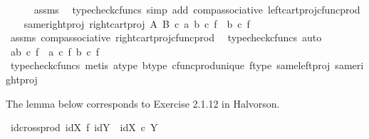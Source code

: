 \begin{isabellebody}
\ \ \ \ \isamarkupfalse%
\ assms\ \isamarkupfalse%
\ {\isacharparenleft}{\kern0pt}typecheck{\isacharunderscore}{\kern0pt}cfuncs{\isacharcomma}{\kern0pt}\ simp\ add{\isacharcolon}{\kern0pt}\ comp{\isacharunderscore}{\kern0pt}associative{}\ left{\isacharunderscore}{\kern0pt}cart{\isacharunderscore}{\kern0pt}proj{\isacharunderscore}{\kern0pt}cfunc{\isacharunderscore}{\kern0pt}prod{\isacharparenright}{\kern0pt}\isanewline
\ \ \isamarkupfalse%
\ same{\isacharunderscore}{\kern0pt}right{\isacharunderscore}{\kern0pt}proj{\isacharcolon}{\kern0pt}\ {\isachardoublequoteopen}right{\isacharunderscore}{\kern0pt}cart{\isacharunderscore}{\kern0pt}proj\ A\ B\ {\isasymcirc}\isactrlsub c\ {\isasymlangle}a{\isacharcomma}{\kern0pt}\ b{\isasymrangle}\ {\isasymcirc}\isactrlsub c\ f\ {\isacharequal}{\kern0pt}\ b\ {\isasymcirc}\isactrlsub c\ f{\isachardoublequoteclose}\isanewline
\ \ \ \ \isamarkupfalse%
\ assms\ comp{\isacharunderscore}{\kern0pt}associative{}\ right{\isacharunderscore}{\kern0pt}cart{\isacharunderscore}{\kern0pt}proj{\isacharunderscore}{\kern0pt}cfunc{\isacharunderscore}{\kern0pt}prod\ \isamarkupfalse%
\ {\isacharparenleft}{\kern0pt}typecheck{\isacharunderscore}{\kern0pt}cfuncs{\isacharcomma}{\kern0pt}\ auto{\isacharparenright}{\kern0pt}\isanewline
\ \ \isamarkupfalse%
\ {\isachardoublequoteopen}{\isasymlangle}a{\isacharcomma}{\kern0pt}b{\isasymrangle}\ {\isasymcirc}\isactrlsub c\ f\ {\isacharequal}{\kern0pt}\ {\isasymlangle}a\ {\isasymcirc}\isactrlsub c\ f{\isacharcomma}{\kern0pt}\ b\ {\isasymcirc}\isactrlsub c\ f{\isasymrangle}{\isachardoublequoteclose}\isanewline
\ \ \ \ \isamarkupfalse%
\ {\isacharparenleft}{\kern0pt}typecheck{\isacharunderscore}{\kern0pt}cfuncs{\isacharcomma}{\kern0pt}\ metis\ a{\isacharunderscore}{\kern0pt}type\ b{\isacharunderscore}{\kern0pt}type\ cfunc{\isacharunderscore}{\kern0pt}prod{\isacharunderscore}{\kern0pt}unique\ f{\isacharunderscore}{\kern0pt}type\ same{\isacharunderscore}{\kern0pt}left{\isacharunderscore}{\kern0pt}proj\ same{\isacharunderscore}{\kern0pt}right{\isacharunderscore}{\kern0pt}proj{\isacharparenright}{\kern0pt}\isanewline
{}\isamarkupfalse%
%
\endisatagproof
{\isafoldproof}%
%
\isadelimproof
%
\endisadelimproof
%
\begin{isamarkuptext}%
The lemma below corresponds to Exercise 2.1.12 in Halvorson.%
\end{isamarkuptext}\isamarkuptrue%
\isamarkupfalse%
\ id{\isacharunderscore}{\kern0pt}cross{\isacharunderscore}{\kern0pt}prod{\isacharcolon}{\kern0pt}\ {\isachardoublequoteopen}id{\isacharparenleft}{\kern0pt}X{\isacharparenright}{\kern0pt}\ {\isasymtimes}\isactrlsub f\ id{\isacharparenleft}{\kern0pt}Y{\isacharparenright}{\kern0pt}\ {\isacharequal}{\kern0pt}\ id{\isacharparenleft}{\kern0pt}X\ {\isasymtimes}\isactrlsub c\ Y{\isacharparenright}{\kern0pt}{\isachardoublequoteclose}\isanewline

\end{isabellebody}
